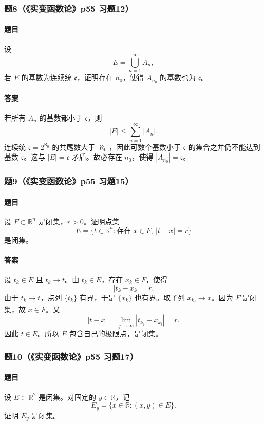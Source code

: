\documentclass{article}
\newcommand{\R}{\mathbb{R}}
\begin{document}
\subsubsection*{题8（《实变函数论》p55 习题12）}
\paragraph{题目}设
\[
E=\bigcup_{n=1}^{\infty}A_n,
\]
若 $E$ 的基数为连续统 $\mathfrak c$，证明存在 $n_0$，使得 $A_{n_0}$ 的基数也为 $\mathfrak c$。

\paragraph{答案}若所有 $A_n$ 的基数都小于 $\mathfrak c$，则
\[
|E|\le\sum_{n=1}^{\infty}|A_n|.
\]
连续统 $\mathfrak c=2^{\aleph_0}$ 的共尾数大于 $\aleph_0$，因此可数个基数小于 $\mathfrak c$ 的集合之并仍不能达到基数 $\mathfrak c$。这与 $|E|=\mathfrak c$ 矛盾。故必存在 $n_0$，使得 $|A_{n_0}|=\mathfrak c$。

\subsubsection*{题9（《实变函数论》p55 习题15）}
\paragraph{题目}设 $F\subset\R^n$ 是闭集，$r>0$。证明点集
\[
E=\{t\in\R^n:\text{存在 }x\in F,\ |t-x|=r\}
\]
是闭集。

\paragraph{答案}设 $t_k\in E$ 且 $t_k\to t$。由 $t_k\in E$，存在 $x_k\in F$，使得
\[
|t_k-x_k|=r.
\]
由于 $t_k\to t$，点列 $\{t_k\}$ 有界，于是 $\{x_k\}$ 也有界。取子列 $x_{k_j}\to x$。因为 $F$ 是闭集，故 $x\in F$。又
\[
|t-x|=\lim_{j\to\infty}|t_{k_j}-x_{k_j}|=r.
\]
因此 $t\in E$。所以 $E$ 包含自己的极限点，是闭集。

\subsubsection*{题10（《实变函数论》p55 习题17）}
\paragraph{题目}设 $E\subset\R^2$ 是闭集。对固定的 $y\in\R$，记
\[
E_y=\{x\in\R:(x,y)\in E\}.
\]
证明 $E_y$ 是闭集。
\end{document}

